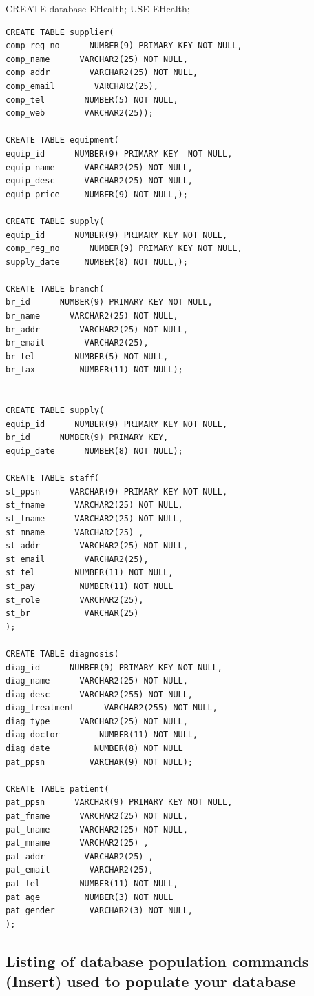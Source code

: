 \documentclass{article}
\begin{document}
CREATE database EHealth;
USE EHealth;
\begin{lstlisting}
CREATE TABLE supplier(
comp_reg_no      NUMBER(9) PRIMARY KEY NOT NULL,
comp_name      VARCHAR2(25) NOT NULL,
comp_addr        VARCHAR2(25) NOT NULL,
comp_email        VARCHAR2(25),
comp_tel        NUMBER(5) NOT NULL,
comp_web        VARCHAR2(25));

CREATE TABLE equipment(
equip_id      NUMBER(9) PRIMARY KEY  NOT NULL,
equip_name      VARCHAR2(25) NOT NULL,
equip_desc      VARCHAR2(25) NOT NULL,
equip_price		NUMBER(9) NOT NULL,);

CREATE TABLE supply(
equip_id      NUMBER(9) PRIMARY KEY NOT NULL,
comp_reg_no      NUMBER(9) PRIMARY KEY NOT NULL,
supply_date		NUMBER(8) NOT NULL,);

CREATE TABLE branch(
br_id      NUMBER(9) PRIMARY KEY NOT NULL,
br_name      VARCHAR2(25) NOT NULL,
br_addr        VARCHAR2(25) NOT NULL,
br_email        VARCHAR2(25),
br_tel        NUMBER(5) NOT NULL,
br_fax         NUMBER(11) NOT NULL);


CREATE TABLE supply(
equip_id      NUMBER(9) PRIMARY KEY NOT NULL,
br_id      NUMBER(9) PRIMARY KEY,
equip_date		NUMBER(8) NOT NULL);

CREATE TABLE staff(
st_ppsn      VARCHAR(9) PRIMARY KEY NOT NULL,
st_fname      VARCHAR2(25) NOT NULL,
st_lname      VARCHAR2(25) NOT NULL,
st_mname      VARCHAR2(25) ,
st_addr        VARCHAR2(25) NOT NULL,
st_email        VARCHAR2(25),
st_tel        NUMBER(11) NOT NULL,
st_pay         NUMBER(11) NOT NULL
st_role        VARCHAR2(25),
st_br			VARCHAR(25)
);

CREATE TABLE diagnosis(
diag_id      NUMBER(9) PRIMARY KEY NOT NULL,
diag_name      VARCHAR2(25) NOT NULL,
diag_desc      VARCHAR2(255) NOT NULL,
diag_treatment      VARCHAR2(255) NOT NULL,
diag_type      VARCHAR2(25) NOT NULL,
diag_doctor        NUMBER(11) NOT NULL,
diag_date         NUMBER(8) NOT NULL
pat_ppsn         VARCHAR(9) NOT NULL);

CREATE TABLE patient(
pat_ppsn      VARCHAR(9) PRIMARY KEY NOT NULL,
pat_fname      VARCHAR2(25) NOT NULL,
pat_lname      VARCHAR2(25) NOT NULL,
pat_mname      VARCHAR2(25) ,
pat_addr        VARCHAR2(25) ,
pat_email        VARCHAR2(25),
pat_tel        NUMBER(11) NOT NULL,
pat_age         NUMBER(3) NOT NULL
pat_gender       VARCHAR2(3) NOT NULL,
);

\end{lstlisting}


\pagebreak


\subsection{Listing of database population commands (Insert) used to populate your database}
\end{document}
